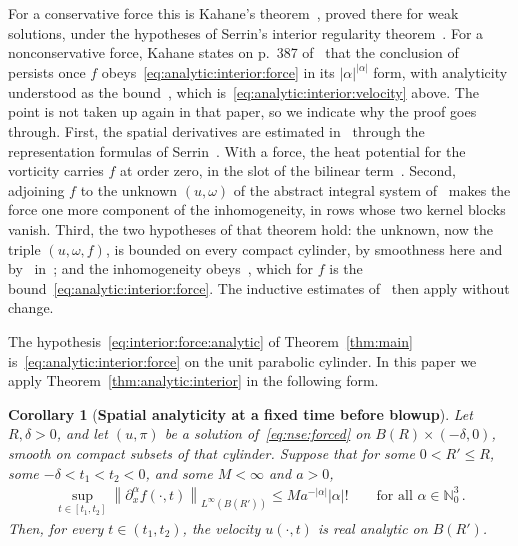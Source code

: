 \documentclass[11pt,reqno]{amsproc}
\numberwithin{equation}{section}
\newtheorem{corollary}[theorem]{Corollary}
\theoremstyle{remark}
\newcommand{\p}{\partial}
\newcommand{\norm}[1]{\left\|#1\right\|}
\begin{document}
For a conservative force this is Kahane's theorem~\cite[Theorem~1.2]{Kahane69}, proved there for weak solutions, under the hypotheses of Serrin's interior regularity theorem~\cite[Section~3]{Serrin62}. For a nonconservative force, Kahane states on p.~387 of~\cite{Kahane69} that the conclusion of~\cite[Theorem~1.2]{Kahane69} persists once $f$ obeys~\eqref{eq:analytic:interior:force} in its $|\alpha|^{|\alpha|}$ form, with analyticity understood as the bound~\cite[equation~(1.5)]{Kahane69}, which is~\eqref{eq:analytic:interior:velocity} above. The point is not taken up again in that paper, so we indicate why the proof goes through. First, the spatial derivatives are estimated in~\cite{Kahane69} through the representation formulas of Serrin~\cite[equations~(18) and~(20)]{Serrin62}. With a force, the heat potential for the vorticity carries $f$ at order zero, in the slot of the bilinear term~\cite[Section~4, equation~(23) and the display which follows it]{Serrin62}. Second, adjoining $f$ to the unknown $(u,\omega)$ of the abstract integral system of~\cite[Theorem~1.3]{Kahane69} makes the force one more component of the inhomogeneity, in rows whose two kernel blocks vanish. Third, the two hypotheses of that theorem hold: the unknown, now the triple $(u,\omega,f)$, is bounded on every compact cylinder, by smoothness here and by~\cite[Theorem~1.1]{Kahane69} in~\cite{Kahane69}; and the inhomogeneity obeys~\cite[equation~(1.5)]{Kahane69}, which for $f$ is the bound~\eqref{eq:analytic:interior:force}. The inductive estimates of~\cite[Section~4]{Kahane69} then apply without change.

The hypothesis~\eqref{eq:interior:force:analytic} of Theorem~\ref{thm:main} is~\eqref{eq:analytic:interior:force} on the unit parabolic cylinder. In this paper we apply Theorem~\ref{thm:analytic:interior} in the following form.

\begin{corollary}[{\bf Spatial analyticity at a fixed time before blowup}]
\label{lem:analytic:slice}
Let $R,\delta>0$, and let $(u,\pi)$ be a solution of~\eqref{eq:nse:forced} on $B(R)\times(-\delta,0)$, smooth on compact subsets of that cylinder. Suppose that for some $0<R'\le R$, some $-\delta<t_1<t_2<0$, and some $M<\infty$ and $a>0$,
\begin{align}
\sup_{t\in[t_1,t_2]}\norm{\p_x^\alpha f(\cdot,t)}_{L^\infty(B(R'))}
\le Ma^{-|\alpha|}|\alpha|!
\qquad\mbox{for all }\alpha\in\mathbb N_0^3
\,.
\label{eq:analytic:slice:force}
\end{align}
Then, for every $t\in(t_1,t_2)$, the velocity $u(\cdot,t)$ is real analytic on $B(R')$.
\end{corollary}
\end{document}
